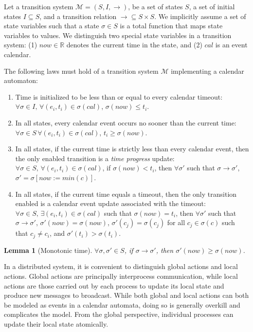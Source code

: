 \documentclass{IEEEtran/IEEEtran}
\newtheorem{lemma}{Lemma}
\begin{document}
Let a transition system $\mathcal{M} = (S, I, \rightarrow)$, be a set of states $S$, a set of initial states $I \subseteq S$, and a transition relation $\rightarrow \subseteq S \times S$. We implicitly assume a set of state variables such that a state $\sigma \in S$ is a total function that maps state variables to values. We distinguish two special state variables in a transition system: (1) $now \in \mathbb{R}$ denotes the current time in the state, and (2) $cal$ is an event calendar.

The following laws must hold of a transition system $\mathcal{M}$ implementing a calendar automaton:

\begin{enumerate}
\item Time is initialized to be less than or equal to every calendar timeout: $\forall \sigma \in I, \, \forall (e_i, t_i) \in \sigma(cal)$, $\sigma(now) \leq t_i$.

\item In all states, every calendar event occurs no sooner than the current time: $\forall \sigma \in S \, \forall (e_i, t_i) \in \sigma(cal)$, $t_i \geq \sigma(now)$.

\item In all states, if the current time is strictly less than every calendar event, then the only enabled transition is a \emph{time progress} update: $\forall \sigma \in S, \, \forall (e_i, t_i) \in \sigma(cal)$, if $\sigma(now) < t_i$, then $\forall \sigma'$ such that $\sigma \rightarrow \sigma'$, $\sigma' = \sigma[now := min(c)]$.

\item In all states, if the current time equals a timeout, then the only transition enabled is a calendar event update associated with the timeout: $\forall \sigma \in S, \, \exists (e_i, t_i) \in \sigma(cal)$ such that $\sigma(now) = t_i$, then $\forall \sigma'$ such that $\sigma \rightarrow \sigma'$, $\sigma'(now) = \sigma(now)$, $\sigma'(c_j) = \sigma(c_j)$ for all $c_j \in \sigma(c)$ such that $c_j \neq c_i$, and $\sigma'(t_i) > \sigma(t_i)$.
\end{enumerate}

\begin{lemma}[Monotonic time]
$\forall \sigma, \sigma' \in S$, if $\sigma \rightarrow \sigma'$, then $\sigma'(now) \geq \sigma(now)$.
\end{lemma}

In a distributed system, it is convenient to distinguish global actions and local actions. Global actions are principally interprocess communication, while local actions are those carried out by each process to update its local state and produce new messages to broadcast. While both global and local actions can both be modeled as events in a calendar automata, doing so is generally overkill and complicates the model. From the global perspective, individual processes can update their local state atomically.
\end{document}
